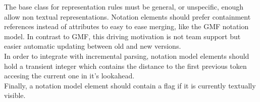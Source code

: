 The base class for representation rules must be general, or unspecific, enough allow non textual representations. Notation elements should prefer containment references instead of attributes to easy to ease merging, like the GMF notation model. In contrast to GMF, this driving motivation is not team support but easier automatic updating between old and new versions.\\
In order to integrate with incremental parsing, notation model elements should hold a transient integer which contains the distance to the first previous token accesing the current one in it's lookahead. \\
Finally, a notation model element should contain a flag if it is currently textually visible.





 


